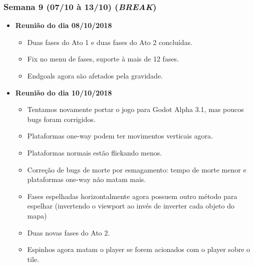 \documentclass[a4paper, 11pt]{article}
\begin{document}
\subsubsection{Semana 9 (07/10 à 13/10) (\textit{BREAK})}
	\begin{itemize} 
		\item \textbf{Reunião do dia 08/10/2018}

		\begin{itemize}
    		
    		\item Duas fases do Ato 1 e duas fases do Ato 2 concluídas.
    		\item Fix no menu de fases, suporte à mais de 12 fases.
    		\item Endgoals agora são afetados pela gravidade.

   		\end{itemize}

		\item \textbf{Reunião do dia 10/10/2018}

		\begin{itemize}

    		\item Tentamos novamente portar o jogo para Godot Alpha 3.1, mas poucos bugs foram corrigidos.
    		\item Plataformas one-way podem ter movimentos verticais agora.
    		\item Plataformas normais estão flickando menos.
    		\item Correção de bugs de morte por esmagamento: tempo de morte menor e plataformas one-way não matam mais.
    		\item Fases espelhadas horizontalmente agora possuem outro método para espelhar (invertendo o viewport ao invés de inverter cada objeto do mapa)
    		\item Duas novas fases do Ato 2.
    		\item Espinhos agora matam o player se forem acionados com o player sobre o tile.

		\end{itemize}

	\end{itemize}
\end{document}
